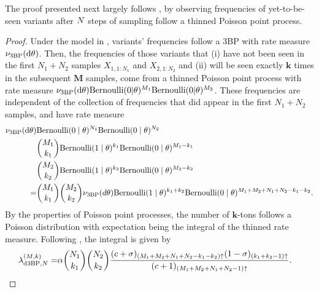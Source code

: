 The proof presented next largely follows \citet{Masoero2021}, by observing frequencies of yet-to-be-seen variants after $\vecsamplesize$ steps of sampling follow a thinned Poisson point process. 
\begin{proof}
    Under the model in , variants' frequencies follow a 3BP with rate measure $\nu_{\mathrm{3BP}}(\mathrm{d}\theta)$. Then, the  frequencies of those variants that (i) have not been seen in the first $N_1+N_2$ samples $X_{1,1:N_1}$ and $X_{2,1:N_2}$ and (ii) will be seen exactly $\bm{k}$ times in the subsequent $\bm{M}$ samples, come from a thinned Poisson point process with rate measure $\nu_{\mathrm{3BP}}(\mathrm{d}\theta)\mathrm{Bernoulli}(0|\theta)^{M_{1}}\mathrm{Bernoulli}(0|\theta)^{M_{2}}$. These frequencies are independent of the collection of frequencies that did appear in the first $N_1 + N_2$ samples, and have rate measure
        \begin{align}
        \nu_{\mathrm{3BP}}(\mathrm{d}\theta)&\mathrm{Bernoulli}(0 \mid \theta)^{N_{1}}\mathrm{Bernoulli}(0 \mid \theta)^{N_{2}} 
        \nonumber\\
        &
        \binom{M_{1}}{k_1}\mathrm{Bernoulli}(1 \mid \theta)^{k_1}\mathrm{Bernoulli}(0 \mid \theta)^{M_{1}-k_1}
        \nonumber\\
        & 
        \binom{M_{2}}{k_2}\mathrm{Bernoulli}(1 \mid \theta)^{k_2}\mathrm{Bernoulli}(0 \mid \theta)^{M_{2}-k_2}\nonumber\\
        =&\binom{M_{1}}{k_1}\binom{M_{2}}{k_2}\nu_{\mathrm{3BP}}(d\theta)\mathrm{Bernoulli}(1 \mid \theta)^{k_1+k_2}\mathrm{Bernoulli}(0 \mid \theta)^{M_{1}+M_{2}+N_{1}+N_{2}-k_1-k_2}.
        \end{align}
    By the properties of Poisson point processes, the number of $\bm{k}$-tons follows a Poisson distribution with expectation being the integral of the thinned rate measure. Following \citet[Proposition 4]{Masoero2021}, the integral is given by
    \begin{align*}
        \lambda^{(\bm{M}, \bm{k})}_{\mathrm{d3BP}, \bm{N}}=&\alpha \binom{\samplesize{1}}{k_1}\binom{\samplesize{2}}{k_2}\frac{(c+\sigma)_{(\futuresamplesize{1}+\futuresamplesize{2}+\samplesize{1}+\samplesize{2}-k_1-k_2)\uparrow }(1-\sigma)_{(k_1+k_2-1)\uparrow}}{(c+1)_{(\futuresamplesize{1}+\futuresamplesize{2}+\samplesize{1}+\samplesize{2}-1)\uparrow }}.
    \end{align*}
\end{proof}

